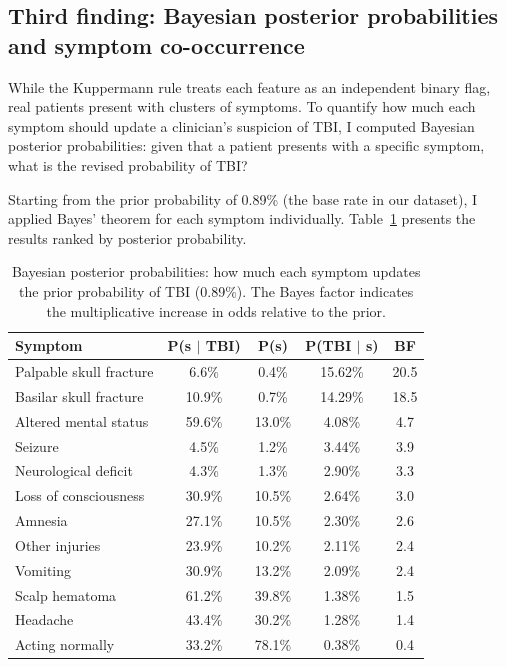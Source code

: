 \documentclass[11pt,letterpaper]{article}
\begin{document}
\subsection{Third finding: Bayesian posterior probabilities and symptom co-occurrence}\label{third-finding}

While the Kuppermann rule treats each feature as an independent binary flag, real patients present with clusters of symptoms. To quantify how much each symptom should update a clinician's suspicion of TBI, I computed Bayesian posterior probabilities: given that a patient presents with a specific symptom, what is the revised probability of TBI?

Starting from the prior probability of 0.89\% (the base rate in our dataset), I applied Bayes' theorem for each symptom individually. Table~\ref{tab:bayes} presents the results ranked by posterior probability.

\begin{table}[h]
\centering
\caption{Bayesian posterior probabilities: how much each symptom updates the prior probability of TBI (0.89\%). The Bayes factor indicates the multiplicative increase in odds relative to the prior.}
\label{tab:bayes}
\small
\begin{tabular}{lcccc}
\hline
\textbf{Symptom} & \textbf{P(s $|$ TBI)} & \textbf{P(s)} & \textbf{P(TBI $|$ s)} & \textbf{BF} \\
\hline
Palpable skull fracture   & 6.6\%  & 0.4\%  & 15.62\% & 20.5 \\
Basilar skull fracture    & 10.9\% & 0.7\%  & 14.29\% & 18.5 \\
Altered mental status     & 59.6\% & 13.0\% &  4.08\% &  4.7 \\
Seizure                   & 4.5\%  & 1.2\%  &  3.44\% &  3.9 \\
Neurological deficit      & 4.3\%  & 1.3\%  &  2.90\% &  3.3 \\
Loss of consciousness     & 30.9\% & 10.5\% &  2.64\% &  3.0 \\
Amnesia                   & 27.1\% & 10.5\% &  2.30\% &  2.6 \\
Other injuries            & 23.9\% & 10.2\% &  2.11\% &  2.4 \\
Vomiting                  & 30.9\% & 13.2\% &  2.09\% &  2.4 \\
\hline
Scalp hematoma            & 61.2\% & 39.8\% &  1.38\% &  1.5 \\
Headache                  & 43.4\% & 30.2\% &  1.28\% &  1.4 \\
Acting normally           & 33.2\% & 78.1\% &  0.38\% &  0.4 \\
\hline
\end{tabular}
\end{table}
\end{document}
